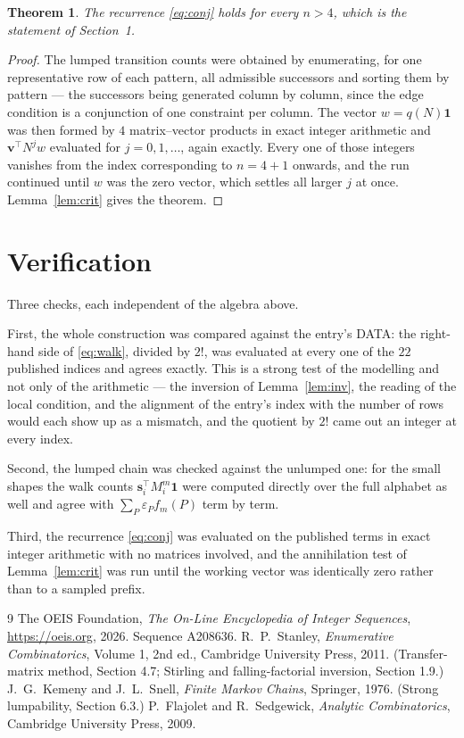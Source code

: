 \documentclass[11pt,a4paper]{article}
\theoremstyle{plain}
\newtheorem{theorem}{Theorem}
\theoremstyle{definition}
\begin{document}
\begin{theorem}
The recurrence \eqref{eq:conj} holds for every $n>4$, which is the statement of
Section~1.
\end{theorem}

\begin{proof}
The lumped transition counts were obtained by enumerating, for one representative row of
each pattern, all admissible successors and sorting them by pattern --- the successors being
generated column by column, since the edge condition is a conjunction of one constraint per
column. The vector $w=q(N)\mathbf{1}$ was then formed by $4$ matrix--vector products
in exact integer arithmetic and $\mathbf{v}^{\!\top}N^{j}w$ evaluated for
$j=0,1,\dots$, again exactly. Every one of those integers vanishes from the index
corresponding to $n=4+1$ onwards, and the run continued until $w$ was the zero vector,
which settles all larger $j$ at once. Lemma~\ref{lem:crit} gives the theorem.
\end{proof}

\section{Verification}

Three checks, each independent of the algebra above.

First, the whole construction was compared against the entry's DATA: the right-hand side of
\eqref{eq:walk}, divided by $2!$, was evaluated at every one of the $22$
published indices and agrees exactly. This is a strong test of the modelling and not only of
the arithmetic --- the inversion of Lemma~\ref{lem:inv}, the reading of the local
condition, and the alignment of the entry's index with the number of rows would each
show up as a mismatch, and the quotient by $2!$ came out an integer at every index.

Second, the lumped chain was checked against the unlumped one: for the small shapes the walk
counts $\mathbf{s}_i^{\!\top}M_i^{m}\mathbf{1}$ were computed directly over the full
alphabet as well and agree with $\sum_P\varepsilon_Pf_m(P)$ term by term.

Third, the recurrence \eqref{eq:conj} was evaluated on the published terms in exact integer
arithmetic with no matrices involved, and the annihilation test of Lemma~\ref{lem:crit} was
run until the working vector was identically zero rather than to a sampled prefix.

\begin{thebibliography}{9}
 The OEIS Foundation, \emph{The On-Line Encyclopedia of Integer
Sequences}, \url{https://oeis.org}, 2026. Sequence A208636.
 R.~P.~Stanley, \emph{Enumerative Combinatorics}, Volume 1, 2nd ed.,
Cambridge University Press, 2011. (Transfer-matrix method, Section 4.7; Stirling and
falling-factorial inversion, Section 1.9.)
 J.~G.~Kemeny and J.~L.~Snell, \emph{Finite Markov Chains}, Springer,
1976. (Strong lumpability, Section 6.3.)
 P.~Flajolet and R.~Sedgewick, \emph{Analytic Combinatorics}, Cambridge
University Press, 2009.
\end{thebibliography}
\end{document}
